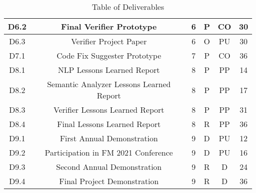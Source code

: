 \begin{table}[hbpt]
\begin{adjustbox}{width=1\textwidth}
\begin{tabular}{ |c|c|c|c|c|c|}
			D6.2 & Final Verifier Prototype & 6 & P & CO & 30\\
			\hline
			
			D6.3 & Verifier Project Paper & 6 & O & PU & 30\\
			\hline
			
			D7.1 & Code Fix Suggester Prototype & 7 & P & CO & 36\\
			\hline
			
			D8.1 & \gls{NLP} Lessons Learned Report & 8 & P & PP & 14\\
			\hline
			
			D8.2 & Semantic Analyzer Lessons Learned Report & 8 & P & PP & 17\\
			\hline
			
			D8.3 & Verifier Lessons Learned Report & 8 & P & PP & 31\\
			\hline
			
			D8.4 & Final Lessons Learned Report & 8 & R & PP & 36\\
			\hline
			
			D9.1 & First Annual Demonstration & 9 & D & PU & 12\\
			\hline
			
			D9.2 & Participation in FM 2021 Conference & 9 & D & PU & 16\\
			\hline
			
			D9.3 & Second Annual Demonstration & 9 & R & D & 24\\
			\hline
			
			D9.4 & Final Project Demonstration & 9 & R & D & 36\\
			\hline
			
		\end{tabular}
	\end{adjustbox}
\caption{Table of Deliverables}
\end{table}